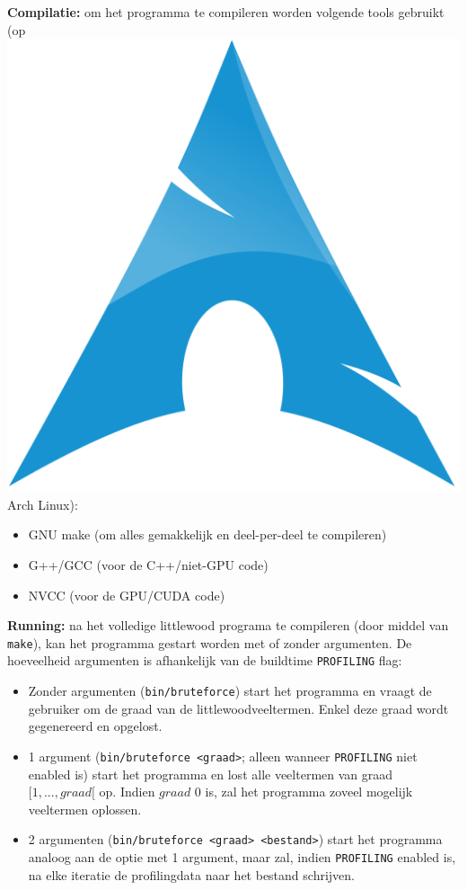 \documentclass{article}
\begin{document}
\textbf{Compilatie:} om het programma te compileren worden volgende tools gebruikt (op \includegraphics[height=\fontcharht\font`\B]{figures/arch.png} Arch Linux):
\begin{itemize}
 \item GNU make (om alles gemakkelijk en deel-per-deel te compileren)
 \item G++/GCC (voor de C++/niet-GPU code)
 \item NVCC (voor de GPU/CUDA code)
\end{itemize}

\textbf{Running:} na het volledige littlewood programa te compileren (door middel van \verb|make|), kan het programma gestart worden met of zonder argumenten. De hoeveelheid argumenten is afhankelijk van de buildtime \verb|PROFILING| flag:
\begin{itemize}
 \item Zonder argumenten (\verb|bin/bruteforce|) start het programma en vraagt de gebruiker om de graad van de littlewoodveeltermen. Enkel deze graad wordt gegenereerd en opgelost.
 \item 1 argument (\verb|bin/bruteforce <graad>|; alleen wanneer \verb|PROFILING| niet enabled is) start het programma en lost alle veeltermen van graad $[1, ..., graad[$ op. Indien $graad$ 0 is, zal het programma zoveel mogelijk veeltermen oplossen.
 \item 2 argumenten (\verb|bin/bruteforce <graad> <bestand>|) start het programma analoog aan de optie met 1 argument, maar zal, indien \verb|PROFILING| enabled is, na elke iteratie de profilingdata naar het bestand schrijven.
\end{itemize}
\end{document}
